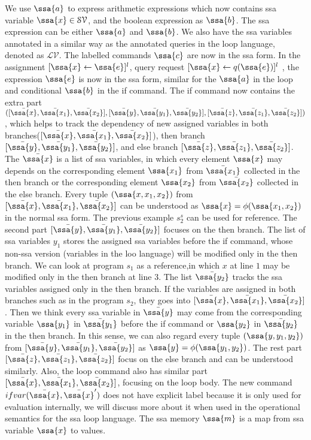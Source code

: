 We use $\ssa{\aexpr}$ to express arithmetic expressions which now contains ssa variable $\ssa{x} \in \mathcal{SV}$, and the boolean expression as $\ssa{\bexpr}$. The ssa expression can be either $\ssa{a}$ and $\ssa{b}$. We also have the ssa variables annotated in a similar way as the annotated queries in the loop language, denoted as $\mathcal{LV}$. The labelled commands $\ssa{c}$ are now in the ssa form. In the assignment $[\assign {\ssa{x}}{ \ssa{\expr}}]^{l}$,  query request $[\assign {{\ssa{x}} } {q({\ssa{e}})}]^{l}$ , the expression ${\ssa{\expr}}$ is now in the ssa form, similar for the $\ssa{\aexpr}$ in the loop and conditional $\ssa{\bexpr}$ in the if command. The if command now contains the extra part $([\bar{\ssa{x}}, \bar{\ssa{x_1}}, \bar{\ssa{x_2}}] , [\bar{\ssa{y}}, \bar{\ssa{y_1}}, \bar{\ssa{y_2}}],[\bar{\ssa{z}}, \bar{\ssa{z_1}}, \bar{\ssa{z_2}}] )$, which helps to track the dependency of new assigned variables in both branches($[\bar{\ssa{x}}, \bar{\ssa{x_1}}, \bar{\ssa{x_2}}]$), then branch $[\bar{\ssa{y}}, \bar{\ssa{y_1}}, \bar{\ssa{y_2}}]$, and else branch $[\bar{\ssa{z}}, \bar{\ssa{z_1}}, \bar{\ssa{z_2}}] $. The $\bar{\ssa{x}}$ is a list of ssa variables, in which every element $\ssa{x}$ may depends on the corresponding element $\ssa{x_1}$ from $\bar{\ssa{x_1}}$ collected in the then branch or the corresponding element $\ssa{x_2}$ from $\bar{\ssa{x_2}}$ collected in the else branch. Every tuple $(\ssa{x,x_1,x_2 })$ from $[\bar{\ssa{x}}, \bar{\ssa{x_1}}, \bar{\ssa{x_2}}]$ can be understood as $\ssa{x} = \phi(\ssa{x_1,x_2})$ in the normal ssa form. The previous example $s_2^{s}$ can be used for reference. The second part $[\bar{\ssa{y}}, \bar{\ssa{y_1}}, \bar{\ssa{y_2}}]$ focuses on the then branch. The list of ssa variables $y_1$ stores the assigned ssa variables before the if command, whose non-ssa version (variables in the loo language) will be modified only in the then branch. We can look at program $s_1$ as a reference,in which $x$ at line $1$ may be modified only in the then branch at line $3$. The list $\bar{\ssa{y_2}}$ tracks the ssa variables assigned only in the then branch. If the variables are assigned in both branches such as in the program $s_2$, they goes into $[\bar{\ssa{x}}, \bar{\ssa{x_1}}, \bar{\ssa{x_2}}]$. Then we think every ssa variable in $\bar{\ssa{y}}$ may come from the corresponding variable $\ssa{y_1}$ in $\bar{\ssa{y_1}}$ before the if command or $\ssa{y_2}$ in $\bar{\ssa{y_2}}$ in the then branch. In this sense, we can also regard every tuple $(\ssa{y,y_1,y_2 })$ from $[\bar{\ssa{y}}, \bar{\ssa{y_1}}, \bar{\ssa{y_2}}]$ as $\ssa{y} = \phi(\ssa{y_1,y_2})$.  The rest part $[\bar{\ssa{z}}, \bar{\ssa{z_1}}, \bar{\ssa{z_2}}]$ focus on the else branch and can be understood similarly. Also, the loop command also has similar part $ [\bar{\ssa{x}}, \bar{\ssa{x_1}}, \bar{\ssa{x_2}}]$, focusing on the loop body. The new command ${{ifvar(\bar{\ssa{x}}, \bar{\ssa{x}}')}}$ does not have explicit label because it is only used for evaluation internally, we will discuss more about it when used in the operational semantics for the ssa loop language. The ssa memory $\ssa{m}$ is a map from ssa variable $\ssa{x}$ to values.

